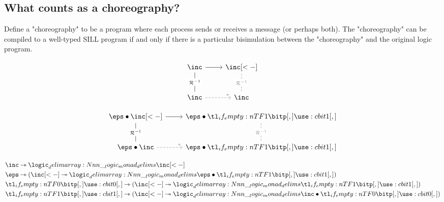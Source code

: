 




\subsection{What counts as a choreography?}\label{sec:what-counts-choreo}

\begin{claim*}
  Define a "choreography" to be a program where each process sends or receives a message (or perhaps both).
  The "choreography" can be compiled to a well-typed SILL program if and only if there is a particular bisimulation between the "choreography" and the original logic program.
\end{claim*}






\begin{equation*}
  \begin{tikzcd}[row sep = 6ex]
    \inc \rar \dar[dash][description]{\mathcal{R}^{-1}}
      & \inc[<-] \dar[gray,dash,dashed][description]{\mathcal{R}^{-1}}
    \\
    \inc \rar[gray,dashed][very near end]{*} & \inc
  \end{tikzcd}
\end{equation*}

\begin{equation*}
  \begin{tikzcd}[row sep = 6ex]
    \eps \fuse \inc[<-] \rar \dar[dash][description]{\mathcal{R}^{-1}}
      & \eps \fuse \bit{1} \dar[gray,dash,dashed][description]{\mathcal{R}^{-1}}
    \\
    \eps \fuse \inc \rar[gray,dashed][very near end]{*} & \eps \fuse \bit{1}
  \end{tikzcd}
\end{equation*}



\begin{align*}
  &\inc \lrimp \monad{\inc[<-]} \\
  &\eps \lrimp (\inc[<-] \rimp \monad{\eps \fuse \bit{1}}) \\
  &\bit{0} \lrimp (\inc[<-] \rimp \monad{\bit{1}}) \\
  &\bit{1} \lrimp (\inc[<-] \rimp \monad{\inc \fuse \bit{0}})
\end{align*}

